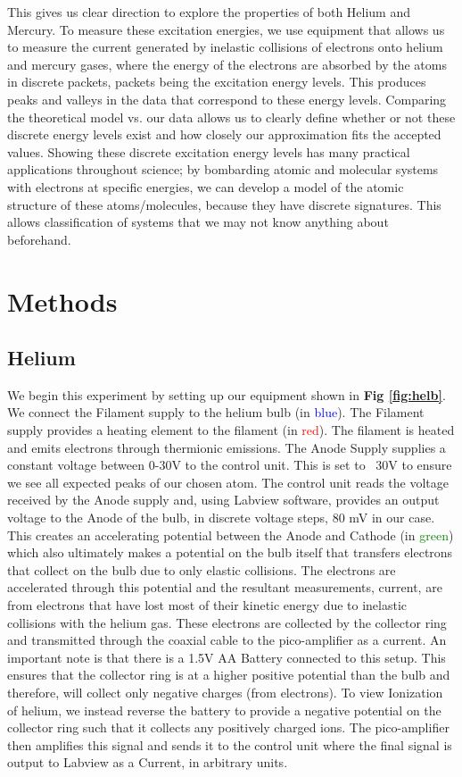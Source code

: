 \documentclass[%
 reprint,
 amsmath,amssymb,
 aps,
]{revtex4-1}
\begin{document}
This gives us clear direction to explore the properties of both Helium and Mercury. To measure these excitation energies, we use equipment that allows us to measure the current generated by inelastic collisions of electrons onto helium and mercury gases, where the energy of the electrons are absorbed by the atoms in discrete packets, packets being the excitation energy levels. This produces peaks and valleys in the data that correspond to these energy levels. Comparing the theoretical model vs. our data allows us to clearly define whether or not these discrete energy levels exist and how closely our approximation fits the accepted values. Showing these discrete excitation energy levels has many practical applications throughout science; by bombarding atomic and molecular systems with electrons at specific energies, we can develop a model of the atomic structure of these atoms/molecules, because they have discrete signatures. This allows classification of systems that we may not know anything about beforehand.


\section{\label{sec:meth}Methods}
\subsection{\label{sec:hel}Helium}

We begin this experiment by setting up our equipment shown in \textbf{Fig \ref{fig:helb}}. We connect the Filament supply to the helium bulb (in \textcolor{blue}{blue}). The Filament supply provides a heating element to the filament (in \textcolor{red}{red}). The filament is heated and emits electrons through thermionic emissions. The Anode Supply supplies a constant voltage between 0-30V to the control unit. This is set to ~30V to ensure we see all expected peaks of our chosen atom.  The control unit reads the voltage received by the Anode supply and, using Labview software, provides an output voltage to the Anode of the bulb, in discrete voltage steps, 80 mV in our case. This creates an accelerating potential between the Anode and Cathode (in \textcolor{green}{green}) which also ultimately makes a potential on the bulb itself that transfers electrons that collect on the bulb due to only elastic collisions. The electrons are accelerated through this potential and the resultant measurements, current, are from electrons that have lost most of their kinetic energy due to inelastic collisions with the helium gas. These electrons are collected by the collector ring and transmitted through the coaxial cable to the pico-amplifier as a current. An important note is that there is a 1.5V AA Battery connected to this setup. This ensures that the collector ring is at a higher positive potential than the bulb and therefore, will collect only negative charges (from electrons). To view Ionization of helium, we instead reverse the battery to provide a negative potential on the collector ring such that it collects any positively charged ions. The pico-amplifier then amplifies this signal and sends it to the control unit where the final signal is output to Labview as a Current, in arbitrary units.\\
\end{document}
